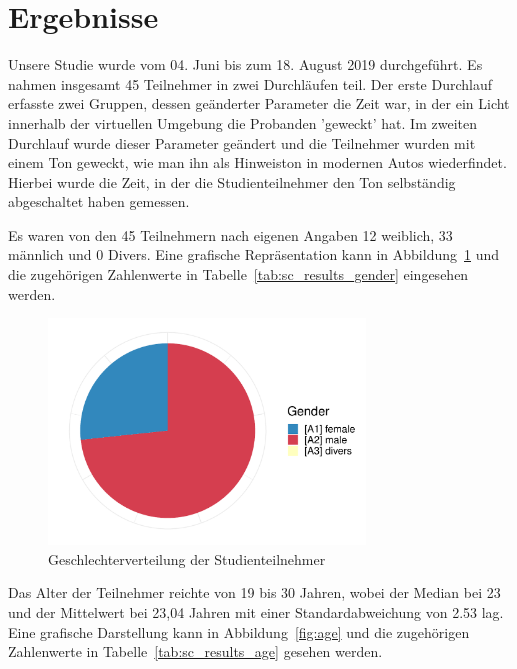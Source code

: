 \section{Ergebnisse}


Unsere Studie wurde vom 04. Juni bis zum 18. August 2019 durchgeführt. Es nahmen insgesamt 45 Teilnehmer in zwei Durchläufen teil. Der erste Durchlauf erfasste zwei Gruppen, dessen geänderter Parameter die Zeit war, in der ein Licht innerhalb der virtuellen Umgebung die Probanden 'geweckt' hat. Im zweiten Durchlauf wurde dieser Parameter geändert und die Teilnehmer wurden mit einem Ton geweckt, wie man ihn als Hinweiston in modernen Autos wiederfindet. Hierbei wurde die Zeit, in der die Studienteilnehmer den Ton selbständig abgeschaltet haben gemessen. 

Es waren von den 45 Teilnehmern nach eigenen Angaben 12 weiblich, 33 männlich und 0 Divers. Eine grafische Repräsentation kann in Abbildung~\ref{fig:gender} und die zugehörigen Zahlenwerte in Tabelle~\ref{tab:sc_results_gender} eingesehen werden. 

\begin{figure}
	\centering
	\includegraphics[width=0.75\textwidth]{./appendices/gender}
	\caption{Geschlechterverteilung der Studienteilnehmer}
	\label{fig:gender}
\end{figure}

Das Alter der Teilnehmer reichte von 19 bis 30 Jahren, wobei der Median bei 23 und der Mittelwert bei 23,04 Jahren mit einer Standardabweichung von 2.53 lag. Eine grafische Darstellung kann in Abbildung~\ref{fig:age} und die zugehörigen Zahlenwerte in Tabelle~\ref{tab:sc_results_age} gesehen werden.

